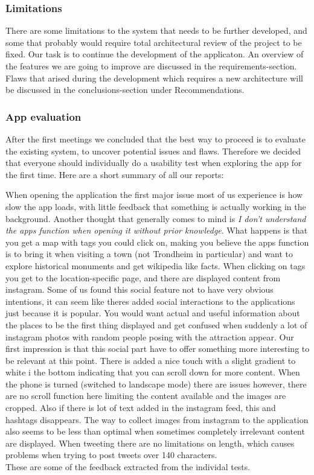		\subsubsection{Limitations}
There are some limitations to the system that needs to be further developed, and some that probably would require total architectural review of the project to be fixed. Our task is to continue the development of the applicaton. An overview of the features we are going to improve are discussed in the requirements-section. Flaws that arised during the development which requires a new architecture will be discussed in the conclusions-section under Recommendations.

		\subsubsection{App evaluation}
		
After the first meetings we concluded that the best way to proceed is to evaluate the existing system, to uncover potential issues and flaws.
Therefore we decided that everyone should individually do a usability test when exploring the app for the first time. Here are a short summary of all our reports:

When opening the application the first major issue most of us experience is how slow the app loads, with little feedback that something is actually working in the background. Another thought that generally comes to mind is \emph{I don't understand the apps function when opening it without prior knowledge}. What happens is that you get a map with tags you could click on, making you believe the apps function is to bring it when visiting a town (not Trondheim in particular) and want to explore historical monuments and get wikipedia like facts. When clicking on tags you get to the location-specific page, and there are displayed content from instagram. Some of us found this social feature not to have very obvious intentions, it can seem like theres added social interactions to the applications just because it is popular. You would want actual and useful information about the places to be the first thing displayed and get confused when suddenly a lot of instagram photos with random people posing with the attraction appear. Our first impression is that this social part have to offer something more interesting to be relevant at this point. There is added a nice touch with a slight gradient to white i the bottom indicating that you can scroll down for more content. When the phone is turned (switched to landscape mode) there are issues however, there are no scroll function here limiting the content available and the images are cropped. Also if there is lot of text added in the instagram feed, this and hashtags disappears. The way to collect images from instagram to the application also seems to be less than optimal when sometimes completely irrelevant content are displayed. When tweeting there are no limitations on length, which causes problems when trying to post tweets over 140 characters.\\
These are some of the feedback extracted from the individal tests. 

